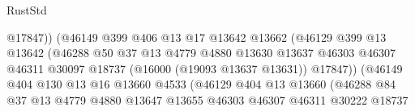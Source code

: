 \begin{lexlean}{RustStd}
\begin{coremodule}
                                            @17847))
                                        (@46149
                                          @399
                                          @406
                                          @13
                                          @17
                                          @13642
                                          @13662
                                          (@46129
                                            @399
                                            @13
                                            @13642
                                            (@46288
                                              @50
                                              @37
                                              @13
                                              @4779
                                              @4880
                                              @13630
                                              @13637
                                              @46303
                                              @46307
                                              @46311
                                              @30097
                                              @18737
                                              (@16000 (@19093 @13637 @13631))
                                              @17847))
                                          (@46149
                                            @404
                                            @130
                                            @13
                                            @16
                                            @13660
                                            @4533
                                            (@46129
                                              @404
                                              @13
                                              @13660
                                              (@46288
                                                @84
                                                @37
                                                @13
                                                @4779
                                                @4880
                                                @13647
                                                @13655
                                                @46303
                                                @46307
                                                @46311
                                                @30222
                                                @18737

\end{coremodule}
\end{lexlean}
